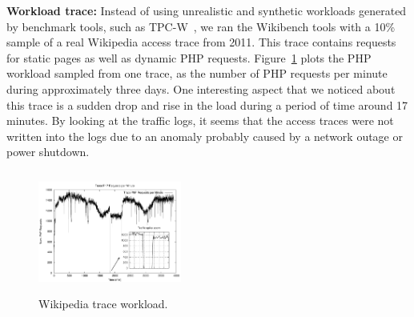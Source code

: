 




\textbf{Workload trace:}  Instead of using unrealistic and synthetic workloads generated by benchmark tools, such as TPC-W~\cite{TPC-W}, we ran the Wikibench tools with a 10\% sample of a real Wikipedia access trace from 2011.  This trace contains requests for static pages as well as dynamic PHP requests. Figure~\ref{workload} plots the PHP workload sampled from one trace, as the number of PHP requests per minute during approximately three days. One interesting aspect that we noticed about this trace is a sudden drop and rise in the load during a period of time around 17 minutes. By looking at the traffic logs, it seems that the access traces were not written into the logs due to an anomaly probably caused by a network outage or power shutdown. 




\begin{figure}
\begin{center}
\includegraphics[width=0.42\textwidth, height=4cm]{./images/traceWorkload_zoom}
\end{center}
\vspace{-5mm}
\caption{Wikipedia trace workload.}
\label{workload}
\end{figure}





